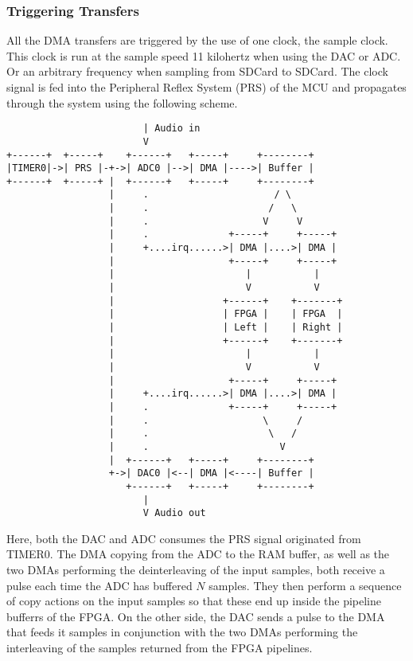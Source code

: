 \subsubsection{Triggering Transfers}

All the DMA transfers are triggered by the use of one clock, the sample clock.
This clock is run at the sample speed 11 kilohertz when using the DAC or ADC. Or
an arbitrary frequency when sampling from SDCard to SDCard. The clock signal is fed into
the Peripheral Reflex System  (PRS) of the MCU and propagates
through the system using the following scheme.

\begin{verbatim}
                        | Audio in
                        V
+------+  +-----+    +------+   +-----+     +--------+
|TIMER0|->| PRS |-+->| ADC0 |-->| DMA |---->| Buffer |
+------+  +-----+ |  +------+   +-----+     +--------+
                  |     .                      / \
                  |     .                     /   \
                  |     .                    V     V
                  |     .              +-----+     +-----+
                  |     +....irq......>| DMA |....>| DMA |
                  |                    +-----+     +-----+
                  |                       |           |
                  |                       V           V
                  |                   +------+    +-------+
                  |                   | FPGA |    | FPGA  |
                  |                   | Left |    | Right |
                  |                   +------+    +-------+
                  |                       |           |
                  |                       V           V
                  |                    +-----+     +-----+
                  |     +....irq......>| DMA |....>| DMA |
                  |     .              +-----+     +-----+
                  |     .                    \     /
                  |     .                     \   /
                  |     .                       V
                  |  +------+   +-----+     +--------+
                  +->| DAC0 |<--| DMA |<----| Buffer |
                     +------+   +-----+     +--------+
                        |
                        V Audio out
\end{verbatim}

Here, both the DAC and ADC consumes the PRS signal originated from TIMER0. The
DMA copying from the ADC to the RAM buffer, as well as the two DMAs performing the
deinterleaving of the input samples, both receive a pulse each time the ADC has
buffered $N$ samples. They then perform a sequence of copy actions on the input
samples so that these end up inside the pipeline bufferrs of the FPGA. On the
other side, the DAC sends a pulse to the DMA that feeds it samples in conjunction
with the two DMAs performing the interleaving of the samples returned from the
FPGA pipelines.
